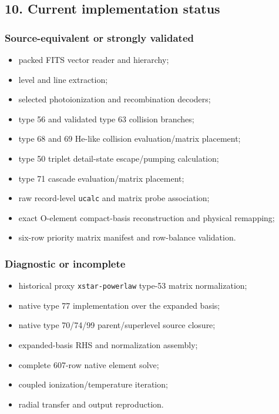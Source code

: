 \documentclass[
  10pt,
]{article}
\newcommand{\passthrough}[1]{#1}
\providecommand{\tightlist}{%
  \setlength{\itemsep}{0pt}\setlength{\parskip}{0pt}}
\begin{document}
\subsection{10. Current implementation
status}\label{current-implementation-status}

\subsubsection{Source-equivalent or strongly
validated}\label{source-equivalent-or-strongly-validated}

\begin{itemize}
\tightlist
\item
  packed FITS vector reader and hierarchy;
\item
  level and line extraction;
\item
  selected photoionization and recombination decoders;
\item
  type 56 and validated type 63 collision branches;
\item
  type 68 and 69 He-like collision evaluation/matrix placement;
\item
  type 50 triplet detail-state escape/pumping calculation;
\item
  type 71 cascade evaluation/matrix placement;
\item
  raw record-level \passthrough{\lstinline!ucalc!} and matrix probe
  association;
\item
  exact O-element compact-basis reconstruction and physical remapping;
\item
  six-row priority matrix manifest and row-balance validation.
\end{itemize}

\subsubsection{Diagnostic or incomplete}\label{diagnostic-or-incomplete}

\begin{itemize}
\tightlist
\item
  historical proxy \passthrough{\lstinline!xstar-powerlaw!} type-53
  matrix normalization;
\item
  native type 77 implementation over the expanded basis;
\item
  native type 70/74/99 parent/superlevel source closure;
\item
  expanded-basis RHS and normalization assembly;
\item
  complete 607-row native element solve;
\item
  coupled ionization/temperature iteration;
\item
  radial transfer and output reproduction.
\end{itemize}
\end{document}
